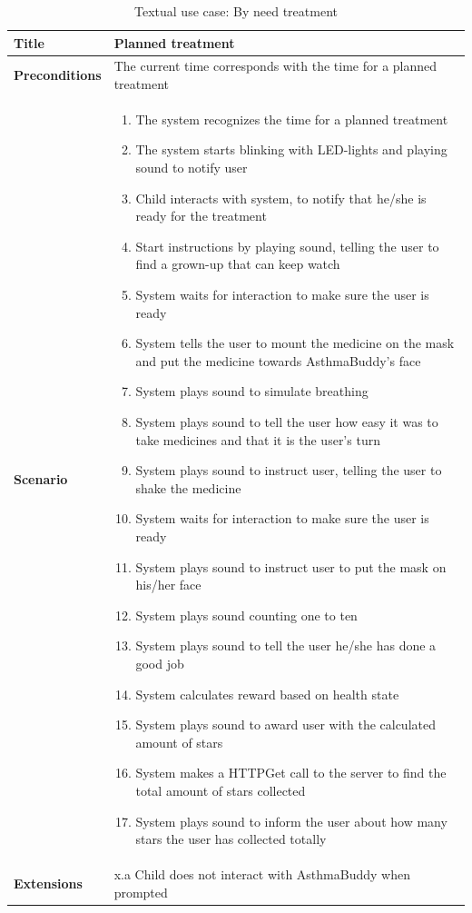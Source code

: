 \begin{table}[H]
\begin{tabular}{|p{4.0cm} | p{9.0cm} |}
\hline
\textbf{Title} & Planned treatment \\
\hline
\textbf{Preconditions} & The current time corresponds with the time for a planned treatment \\
\hline 
\textbf{Scenario} & 
	\begin{enumerate}
	  \itemsep0em
	  \item The system recognizes the time for a planned treatment
	  \item The system starts blinking with LED-lights and playing sound to notify user
	  \item Child interacts with system, to notify that he/she is ready for the treatment
	  \item Start instructions by playing sound, telling the user to find a grown-up that can keep watch
	  \item System waits for interaction to make sure the user is ready
	  \item System tells the user to mount the medicine on the mask and put the medicine towards AsthmaBuddy's face
	  \item System plays sound to simulate breathing
	  \item System plays sound to tell the user how easy it was to take medicines and that it is the user's turn
	  \item System plays sound to instruct user, telling the user to shake the medicine
	  \item System waits for interaction to make sure the user is ready
	  \item System plays sound to instruct user to put the mask on his/her face
	  \item System plays sound counting one to ten
	  \item System plays sound to tell the user he/she has done a good job
	  \item System calculates reward based on health state
	  \item System plays sound to award user with the calculated amount of stars
	  \item System makes a HTTPGet call to the server to find the total amount of stars collected
	  \item System plays sound to inform the user about how many stars the user has collected totally
	\end{enumerate}
\\
\hline
	\textbf{Extensions} & 
		x.a Child does not interact with AsthmaBuddy when prompted
\\
\hline
\end{tabular}
\caption{Textual use case: By need treatment}
\label{tab:textual-use-case}
\end{table} 

